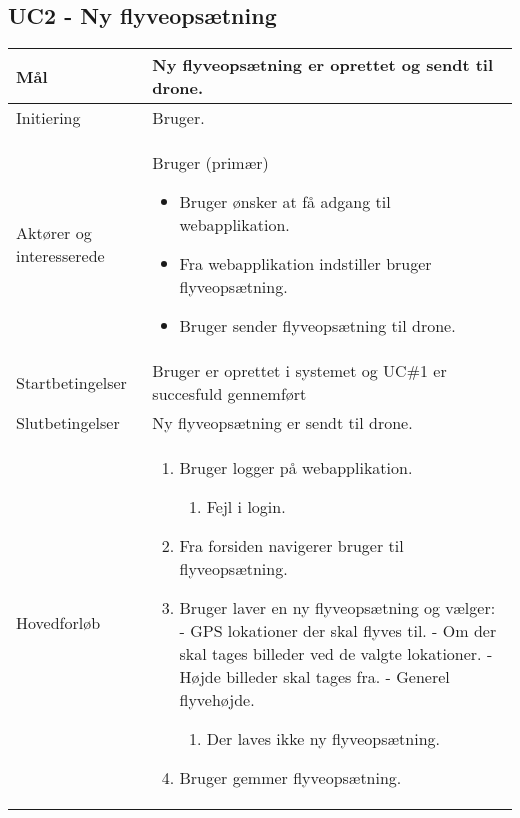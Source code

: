 \subsection*{UC2 - Ny flyveopsætning}

\begin{table}[H]
\begin{tabular}{| p{3cm}| p{11.5cm}|}
\hline

Mål	 							& Ny flyveopsætning er oprettet og sendt til drone. \\\hline
Initiering							& Bruger. \\\hline
Aktører og \newline interesserede			& Bruger (primær) 
										\begin{itemize}
											\item Bruger ønsker at få adgang til webapplikation.
											\item Fra webapplikation indstiller bruger flyveopsætning.
											\item Bruger sender flyveopsætning til drone.
										\end{itemize} \\ \hline
									  
Startbetingelser						& Bruger er oprettet i systemet og UC\#1 er succesfuld gennemført  \\\hline
Slutbetingelser						& Ny flyveopsætning er sendt til drone. \\\hline
Hovedforløb				&
 
									\renewcommand{\labelenumi}{\arabic{enumi}.}
									\renewcommand{\labelenumii}{\Roman{enumii}:}

									\begin{enumerate}[topsep=0.0cm, leftmargin=0.5cm]
										\item Bruger logger på webapplikation.
										\begin{enumerate}[partopsep=4cm, topsep=0cm, leftmargin=1cm]
												\item Fejl i login.
												
										\end{enumerate}
										\item Fra forsiden navigerer bruger til flyveopsætning.
										\item Bruger laver en ny flyveopsætning og vælger:	\newline	
											  - GPS lokationer der skal flyves til. \newline
											  - Om der skal tages billeder ved de valgte lokationer. \newline 
											  - Højde billeder skal tages fra. \newline
											  - Generel flyvehøjde.  		
										\begin{enumerate}[partopsep=4cm, topsep=0cm, leftmargin=1cm]
												\item Der laves ikke ny flyveopsætning.
										\end{enumerate}
										\item Bruger gemmer flyveopsætning.
									\end{enumerate} \\\hline	


\end{tabular}
\end{table}
